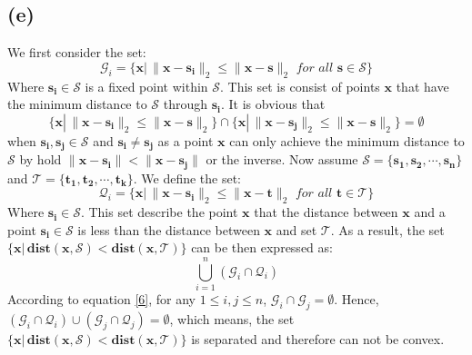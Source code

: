 \documentclass[10pt,a4paper]{article}
\begin{document}
\subsection*{(e)}
We first consider the set:
\begin{equation}
	\mathcal{G}_{i} = \{ \mathbf{x} |\, \| \mathbf{x} - \mathbf{s_{i}} \|_{2} \leq \| \mathbf{x} - \mathbf{s} \|_{2} \textit{ for all } \mathbf{s} \in \mathcal{S} \}
	\label{5}
\end{equation}
Where $\mathbf{s_{i}} \in \mathcal{S}$ is a fixed point within $\mathcal{S}$. This set is consist of points $\mathbf{x}$ that have the minimum distance to $\mathcal{S}$ through $\mathbf{s_{i}}$. It is obvious that
\begin{equation}
	\{ \mathbf{x} |\, \| \mathbf{x} - \mathbf{s_{i}} \|_{2} \leq \| \mathbf{x} - \mathbf{s} \|_{2} \} \cap \{ \mathbf{x} |\, \| \mathbf{x} - \mathbf{s_{j}} \|_{2} \leq \| \mathbf{x} - \mathbf{s} \|_{2} \} = \emptyset
	\label{6}
\end{equation}
when $\mathbf{s_{i}}, \mathbf{s_{j}} \in \mathcal{S}$ and $\mathbf{s_{i}} \neq \mathbf{s_{j}}$ as a point $\mathbf{x}$ can only achieve the minimum distance to $\mathcal{S}$ by hold $\| \mathbf{x} - \mathbf{s_{i}} \| < \| \mathbf{x} - \mathbf{s_{j}} \|$ or the inverse. Now assume $\mathcal{S} = \{ \mathbf{s_{1}}, \mathbf{s_{2}}, \cdots, \mathbf{s_{n}} \}$ and $\mathcal{T} = \{ \mathbf{t_{1}}, \mathbf{t_{2}}, \cdots, \mathbf{t_{k}} \}$. We define the set:
\begin{equation*}
	\mathcal{Q}_{i} = \{ \mathbf{x} |\, \| \mathbf{x} - \mathbf{s_{i}} \|_{2} \leq \| \mathbf{x} - \mathbf{t} \|_{2} \textit{ for all } \mathbf{t} \in \mathcal{T} \}
\end{equation*}
Where $\mathbf{s_{i}} \in \mathcal{S}$. This set describe the point $\mathbf{x}$ that the distance between $\mathbf{x}$ and a point $\mathbf{s_{i}} \in \mathcal{S}$ is less than the distance between $\mathbf{x}$ and set $\mathcal{T}$. As a result, the set $\{ \mathbf{x} |\, \textbf{dist}(\mathbf{x}, \mathcal{S}) < \textbf{dist}(\mathbf{x}, \mathcal{T}) \}$ can be then expressed as:
\begin{equation*}
	\displaystyle\bigcup_{i = 1}^{n}(\mathcal{G}_{i} \cap \mathcal{Q}_{i})
\end{equation*}
According to equation \ref{6}, for any $1 \leq i, j \leq n$, $\mathcal{G}_{i} \cap \mathcal{G}_{j} = \emptyset$. Hence, $(\mathcal{G}_{i} \cap \mathcal{Q}_{i}) \cup (\mathcal{G}_{j} \cap \mathcal{Q}_{j}) = \emptyset$, which means, the set $\{ \mathbf{x} |\, \textbf{dist}(\mathbf{x}, \mathcal{S}) < \textbf{dist}(\mathbf{x}, \mathcal{T}) \}$  is separated and therefore can not be convex.
\end{document}
